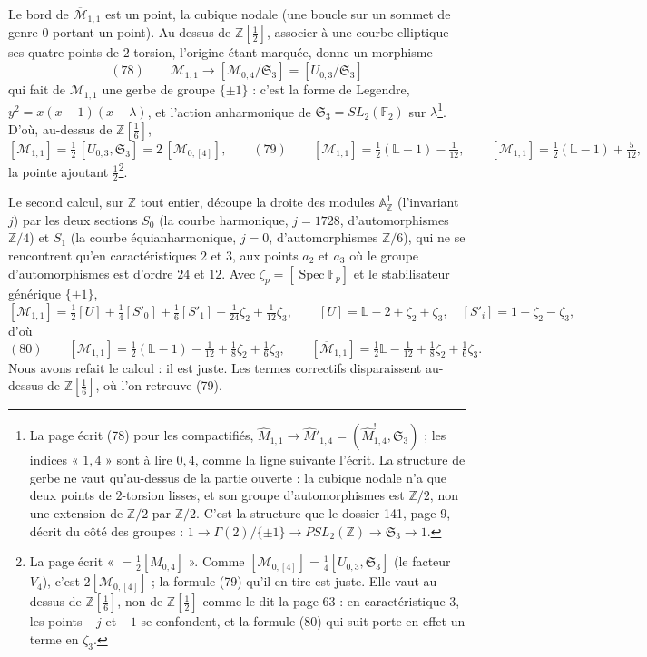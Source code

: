 \documentclass[11pt,a4paper]{article}
\begin{document}
Le bord de $\overline{\mathcal{M}}_{1,1}$ est un point, la cubique nodale (une
boucle sur un sommet de genre $0$ portant un point). Au-dessus de
$\mathbb{Z}[\frac12]$, associer à une courbe elliptique ses quatre points de
$2$-torsion, l'origine étant marquée, donne un morphisme
\[
(78) \qquad \mathcal{M}_{1,1} \longrightarrow [\mathcal{M}_{0,4}/\mathfrak{S}_3]
= [U_{0,3}/\mathfrak{S}_3]
\]
qui fait de $\mathcal{M}_{1,1}$ une gerbe de groupe $\{\pm 1\}$ : c'est la forme
de Legendre, $y^2 = x(x-1)(x-\lambda)$, et l'action anharmonique de
$\mathfrak{S}_3 = SL_2(\mathbb{F}_2)$ sur $\lambda$\footnote{La page écrit (78)
pour les compactifiés, $\widehat{M}_{1,1} \to \widehat{M}'_{1,4} = (\widehat{M}^{!}_{1,4},
\mathfrak{S}_3)$ ; les indices « $1,4$ » sont à lire $0,4$, comme la ligne
suivante l'écrit. La structure de gerbe ne vaut qu'au-dessus de la partie
ouverte : la cubique nodale n'a que deux points de $2$-torsion lisses, et
son groupe d'automorphismes est $\mathbb{Z}/2$, non une extension de
$\mathbb{Z}/2$ par $\mathbb{Z}/2$. C'est la structure que le dossier 141, page 9,
décrit du côté des groupes : $1 \to \Gamma(2)/\{\pm 1\} \to PSL_2(\mathbb{Z}) \to
\mathfrak{S}_3 \to 1$.}. D'où, au-dessus de $\mathbb{Z}[\frac16]$,
\[
[\mathcal{M}_{1,1}] = \tfrac12\,[U_{0,3}, \mathfrak{S}_3] = 2\,[\mathcal{M}_{0,[4]}],
\qquad
(79) \qquad [\mathcal{M}_{1,1}] = \tfrac12(\mathbb{L} - 1) - \tfrac{1}{12}, \qquad
[\overline{\mathcal{M}}_{1,1}] = \tfrac12(\mathbb{L} - 1) + \tfrac{5}{12},
\]
la pointe ajoutant $\frac12$\footnote{La page écrit « $= \frac12 [M_{0,4}]$ ».
Comme $[\mathcal{M}_{0,[4]}] = \frac14 [U_{0,3}, \mathfrak{S}_3]$ (le facteur $V_4$),
c'est $2[\mathcal{M}_{0,[4]}]$ ; la formule (79) qu'il en tire est juste. Elle
vaut au-dessus de $\mathbb{Z}[\frac16]$, non de $\mathbb{Z}[\frac12]$ comme le dit
la page 63 : en caractéristique $3$, les points $-j$ et $-1$ se confondent, et la
formule (80) qui suit porte en effet un terme en $\zeta_3$.}.

Le second calcul, sur $\mathbb{Z}$ tout entier, découpe la droite des modules
$\mathbb{A}^1_{\mathbb{Z}}$ (l'invariant $j$) par les deux sections $S_0$ (la
courbe harmonique, $j = 1728$, d'automorphismes $\mathbb{Z}/4$) et $S_1$ (la
courbe équianharmonique, $j = 0$, d'automorphismes $\mathbb{Z}/6$), qui ne se
rencontrent qu'en caractéristiques $2$ et $3$, aux points $a_2$ et $a_3$ où le
groupe d'automorphismes est d'ordre $24$ et $12$. Avec $\zeta_p = [\operatorname{Spec}
\mathbb{F}_p]$ et le stabilisateur générique $\{\pm 1\}$,
\[
[\mathcal{M}_{1,1}] = \tfrac12 [U] + \tfrac14 [S'_0] + \tfrac16 [S'_1] +
\tfrac{1}{24} \zeta_2 + \tfrac{1}{12} \zeta_3, \qquad [U] = \mathbb{L} - 2 +
\zeta_2 + \zeta_3, \quad [S'_i] = 1 - \zeta_2 - \zeta_3,
\]
d'où
\[
(80) \qquad [\mathcal{M}_{1,1}] = \tfrac12(\mathbb{L} - 1) - \tfrac{1}{12} +
\tfrac18 \zeta_2 + \tfrac16 \zeta_3, \qquad [\overline{\mathcal{M}}_{1,1}] =
\tfrac12 \mathbb{L} - \tfrac{1}{12} + \tfrac18 \zeta_2 + \tfrac16 \zeta_3 .
\]
Nous avons refait le calcul : il est juste. Les termes correctifs disparaissent
au-dessus de $\mathbb{Z}[\frac16]$, où l'on retrouve (79).
\end{document}
